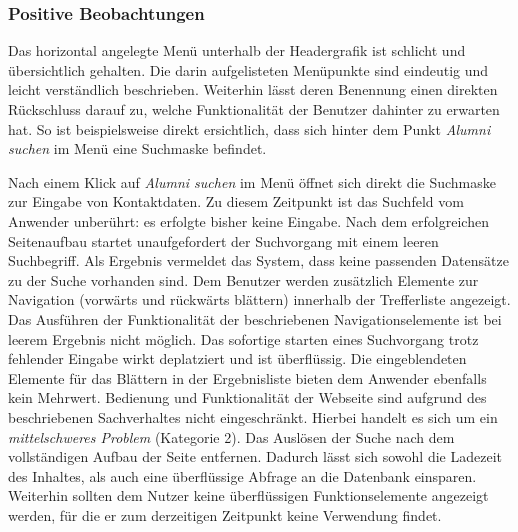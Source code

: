 
\subsubsection*{Positive Beobachtungen}
Das horizontal angelegte Menü unterhalb der Headergrafik ist schlicht und übersichtlich gehalten. Die darin aufgelisteten Menüpunkte sind eindeutig und leicht verständlich beschrieben. Weiterhin lässt deren Benennung einen direkten Rückschluss darauf zu, welche Funktionalität der Benutzer dahinter zu erwarten hat. So ist beispielsweise direkt ersichtlich, dass sich hinter dem Punkt \emph{Alumni suchen} im Menü eine Suchmaske befindet.

{
	Nach einem Klick auf \emph{Alumni suchen} im Menü öffnet sich direkt die Suchmaske zur Eingabe von Kontaktdaten. Zu diesem Zeitpunkt ist das Suchfeld vom Anwender unberührt: es erfolgte bisher keine Eingabe. Nach dem erfolgreichen Seitenaufbau startet unaufgefordert der Suchvorgang mit einem leeren Suchbegriff. Als Ergebnis vermeldet das System, dass keine passenden Datensätze zu der Suche vorhanden sind. Dem Benutzer werden zusätzlich Elemente zur Navigation (vorwärts und rückwärts blättern) innerhalb der Trefferliste angezeigt. Das Ausführen der Funktionalität der beschriebenen Navigationselemente ist bei leerem Ergebnis nicht möglich.
}
{
	Das sofortige starten eines Suchvorgang trotz fehlender Eingabe wirkt deplatziert und ist überflüssig. Die eingeblendeten Elemente für das Blättern in der Ergebnisliste bieten dem Anwender ebenfalls kein Mehrwert. Bedienung und Funktionalität der Webseite sind aufgrund des beschriebenen Sachverhaltes nicht eingeschränkt. Hierbei handelt es sich um ein \emph{mittelschweres Problem} (Kategorie 2).
}
{
	Das Auslösen der Suche nach dem vollständigen Aufbau der Seite entfernen. Dadurch lässt sich sowohl die Ladezeit des Inhaltes, als auch eine überflüssige Abfrage an die Datenbank einsparen. Weiterhin sollten dem Nutzer keine überflüssigen Funktionselemente angezeigt werden, für die er zum derzeitigen Zeitpunkt keine Verwendung findet.
}
\label{prob:suche:suchanfrage}


